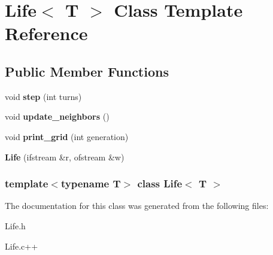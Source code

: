 \hypertarget{classLife}{\section{\-Life$<$ \-T $>$ \-Class \-Template \-Reference}
\label{classLife}
}
\subsection*{\-Public \-Member \-Functions}
\begin{DoxyCompactItemize}
\item 
\hypertarget{classLife_a2a543438e554a63de20c0341cfa1e1df}{void {\bfseries step} (int turns)}\label{classLife_a2a543438e554a63de20c0341cfa1e1df}

\item 
\hypertarget{classLife_a92305c09850c94ef65a4b142b47bbad8}{void {\bfseries update\-\_\-neighbors} ()}\label{classLife_a92305c09850c94ef65a4b142b47bbad8}

\item 
\hypertarget{classLife_ab0369b2d1753487521a0ff52dda413c0}{void {\bfseries print\-\_\-grid} (int generation)}\label{classLife_ab0369b2d1753487521a0ff52dda413c0}

\item 
\hypertarget{classLife_a98f3e60f6898644d7844146f345b3c6d}{{\bfseries \-Life} (ifstream \&r, ofstream \&w)}\label{classLife_a98f3e60f6898644d7844146f345b3c6d}

\end{DoxyCompactItemize}
\subsubsection*{template$<$typename T$>$ class Life$<$ T $>$}



\-The documentation for this class was generated from the following files\-:\begin{DoxyCompactItemize}
\item 
\-Life.\-h\item 
\-Life.\-c++\end{DoxyCompactItemize}
